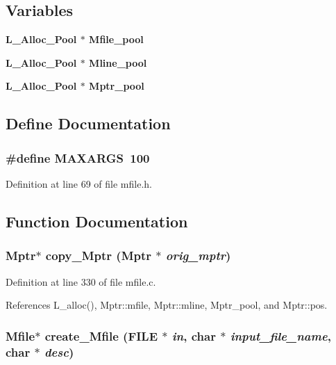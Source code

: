 \subsection*{Variables}
\begin{CompactItemize}
\item 
\bf{L\_\-Alloc\_\-Pool} $\ast$ \bf{Mfile\_\-pool}
\item 
\bf{L\_\-Alloc\_\-Pool} $\ast$ \bf{Mline\_\-pool}
\item 
\bf{L\_\-Alloc\_\-Pool} $\ast$ \bf{Mptr\_\-pool}
\end{CompactItemize}


\subsection{Define Documentation}
\subsubsection{\setlength{\rightskip}{0pt plus 5cm}\#define MAXARGS~100}\label{mfile_8h_41101847771d39a4f0a7f9395061c629}




Definition at line 69 of file mfile.h.

\subsection{Function Documentation}
\subsubsection{\setlength{\rightskip}{0pt plus 5cm}\bf{Mptr}$\ast$ copy\_\-Mptr (\bf{Mptr} $\ast$ {\em orig\_\-mptr})}\label{mfile_8h_e4de11aabd9bbe6c94fbd767a635472e}




Definition at line 330 of file mfile.c.

References L\_\-alloc(), Mptr::mfile, Mptr::mline, Mptr\_\-pool, and Mptr::pos.
\subsubsection{\setlength{\rightskip}{0pt plus 5cm}\bf{Mfile}$\ast$ create\_\-Mfile (FILE $\ast$ {\em in}, char $\ast$ {\em input\_\-file\_\-name}, char $\ast$ {\em desc})}\label{mfile_8h_a2e916b84e74841612e659290c2b2ec2}




